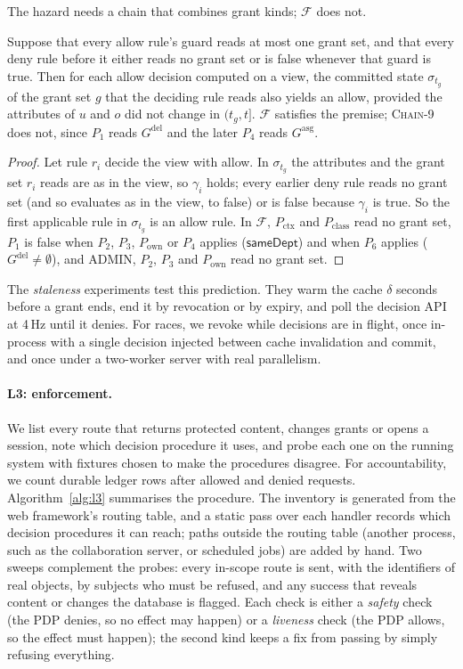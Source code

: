 \documentclass[sigconf,review,anonymous]{acmart}
\newcommand{\chain}{\textsc{Chain-9}\xspace}
\newcommand{\Pc}{P_{\mathrm{class}}}
\newcommand{\Px}{P_{\mathrm{ctx}}}
\newcommand{\Po}{P_{\mathrm{own}}}
\newcommand{\Gasg}{G^{\mathrm{asg}}}
\newcommand{\Gdel}{G^{\mathrm{del}}}
\newcommand{\sameDept}{\mathsf{sameDept}}
\begin{document}
The hazard needs a chain that combines grant kinds; $\mathcal{F}$ does not.

\begin{proposition}\label{prop:witness}
Suppose that every allow rule's guard reads at most one grant set, and that every deny rule before it either reads
no grant set or is false whenever that guard is true. Then for each allow decision computed on a view, the
committed state $\sigma_{t_g}$ of the grant set $g$ that the deciding rule reads also yields an allow, provided the
attributes of $u$ and $o$ did not change in $(t_g,t]$. $\mathcal{F}$ satisfies the premise; \chain does not, since
$P_1$ reads $\Gdel$ and the later $P_4$ reads $\Gasg$.
\end{proposition}
\begin{proof}
Let rule $r_i$ decide the view with allow. In $\sigma_{t_g}$ the attributes and the grant set $r_i$ reads are as in
the view, so $\gamma_i$ holds; every earlier deny rule reads no grant set (and so evaluates as in the view, to
false) or is false because $\gamma_i$ is true. So the first applicable rule in $\sigma_{t_g}$ is an allow rule.
In $\mathcal{F}$, $\Px$ and $\Pc$ read no grant set, $P_1$ is false when $P_2$, $P_3$, $\Po$ or $P_4$ applies
($\sameDept$) and when $P_6$ applies ($\Gdel\neq\emptyset$), and ADMIN, $P_2$, $P_3$ and $\Po$ read no grant set.
\end{proof}


The \emph{staleness} experiments test this prediction. They warm the cache $\delta$ seconds before a grant ends,
end it by revocation or by expiry, and poll the decision API at 4\,Hz until it denies. For
races, we revoke while decisions are in flight, once in-process with a single decision injected between cache
invalidation and commit, and once under a two-worker server with real parallelism.

\paragraph{L3: enforcement.} We list every route that returns protected content, changes grants or opens a
session, note which decision procedure it uses, and probe each one on the running system with fixtures chosen
to make the procedures disagree. For accountability, we count durable ledger rows after allowed and denied
requests. Algorithm~\ref{alg:l3} summarises the procedure. The inventory is generated from the web framework's
routing table, and a static pass over each handler records which decision procedures it can reach; paths outside
the routing table (another process, such as the collaboration server, or scheduled jobs) are added by hand. Two
sweeps complement the probes: every in-scope route is sent, with the identifiers of real objects, by subjects who
must be refused, and any success that reveals content or changes the database is flagged. Each check is either a \emph{safety} check (the PDP denies, so no effect may happen) or a
\emph{liveness} check (the PDP allows, so the effect must happen); the second kind keeps a fix from passing by
simply refusing everything.
\end{document}
